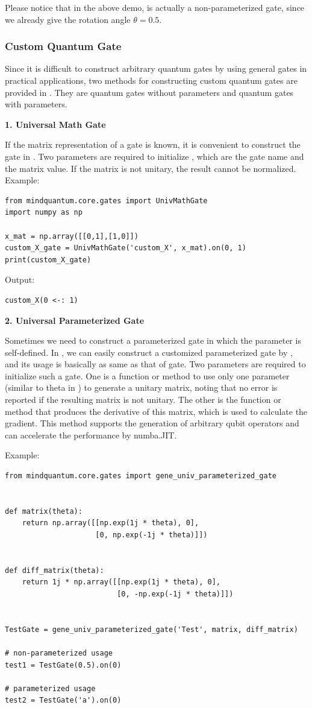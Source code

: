 Please notice that in the above demo,  is actually a non-parameterized gate, since we already give the rotation angle $\theta = 0.5$.

\subsubsection{Custom Quantum Gate}
Since it is difficult to construct arbitrary quantum gates by using general gates in practical applications, two methods for constructing custom quantum gates are provided in \MindQuantum. They are quantum gates without parameters and quantum gates with parameters.

\textbf{1. Universal Math Gate}

If the matrix representation of a gate is known, it is convenient to construct the gate in \MindQuantum. Two parameters are required to initialize \UnivMathGate, which are the gate name and the matrix value. If the matrix is not unitary, the result cannot be normalized.
Example:
\begin{lstlisting}
from mindquantum.core.gates import UnivMathGate
import numpy as np

x_mat = np.array([[0,1],[1,0]])
custom_X_gate = UnivMathGate('custom_X', x_mat).on(0, 1)
print(custom_X_gate)
\end{lstlisting}
Output:
\begin{lstlisting}
custom_X(0 <-: 1)
\end{lstlisting}

\textbf{2. Universal Parameterized Gate}

Sometimes we need to construct a parameterized gate in which the parameter is self-defined. In \MindQuantum, we can easily construct a customized parameterized gate by \geneunivparameterizedgate, and its usage is basically as same as that of \RX gate. Two parameters are required to initialize such a gate. One is a function or method to use only one parameter (similar to theta in \RX) to generate a unitary matrix, noting that no error is reported if the resulting matrix is not unitary. The other is the function or method that produces the derivative of this matrix, which is used to calculate the gradient. This method supports the generation of arbitrary qubit operators and can accelerate the performance by numba.JIT.

Example:
\begin{lstlisting}
from mindquantum.core.gates import gene_univ_parameterized_gate


def matrix(theta):
    return np.array([[np.exp(1j * theta), 0],
                     [0, np.exp(-1j * theta)]])


def diff_matrix(theta):
    return 1j * np.array([[np.exp(1j * theta), 0],
                          [0, -np.exp(-1j * theta)]])


TestGate = gene_univ_parameterized_gate('Test', matrix, diff_matrix)

# non-parameterized usage
test1 = TestGate(0.5).on(0)

# parameterized usage
test2 = TestGate('a').on(0)
\end{lstlisting}

